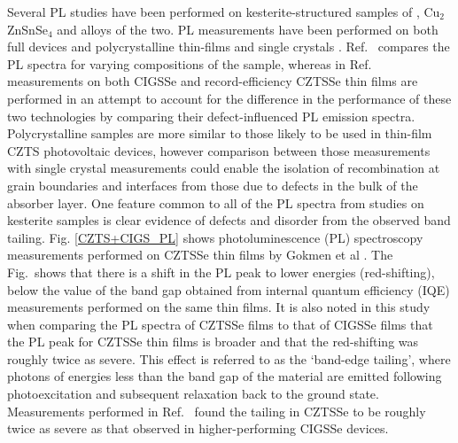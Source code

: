 \documentclass[11pt, twoside]{report}
\begin{document}
Several PL studies have been performed on kesterite-structured samples of {\CZTS}, Cu$_2$ZnSnSe$_4$ and alloys of the two. PL measurements have been performed on both full devices and polycrystalline thin-films \cite{band_tail, Gershon, Gershon_ref18, Romero, Miyamoto, Unold} and single crystals \cite{Halliday, Levcenko, Hones}. Ref.~ compares the PL spectra for varying compositions of the sample, whereas in Ref.~ measurements on both CIGSSe and record-efficiency CZTSSe thin films are performed in an attempt to account for the difference in the performance of these two technologies by comparing their defect-influenced PL emission spectra. Polycrystalline samples are more similar to those likely to be used in thin-film CZTS photovoltaic devices, however comparison between those measurements with single crystal measurements could enable the isolation of recombination at grain boundaries and interfaces from those due to defects in the bulk of the absorber layer. 
One feature common to all of the PL spectra from studies on kesterite samples is clear evidence of defects and disorder from the observed band tailing. 
Fig. \ref{CZTS+CIGS_PL} shows photoluminescence (PL) spectroscopy measurements performed on CZTSSe thin films by Gokmen et al \cite{band_tail}. The Fig.~shows that there is a shift in the PL peak to lower energies (red-shifting), below the value of the band gap obtained from internal quantum efficiency (IQE) measurements performed on the same thin films. It is also noted in this study when comparing the PL spectra of CZTSSe films to that of CIGSSe films that the PL peak for CZTSSe thin films is broader and that the red-shifting was roughly twice as severe. This effect is referred to as the `band-edge tailing', where photons of energies less than the band gap of the material are emitted following photoexcitation and subsequent relaxation back to the ground state. 
Measurements performed in Ref.~ found the tailing in CZTSSe to be roughly twice as severe as that observed in higher-performing CIGSSe devices.
\end{document}
